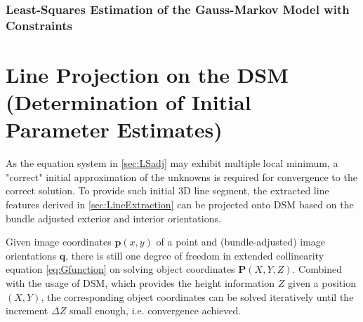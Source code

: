 \subsubsection{Least-Squares Estimation of the Gauss-Markov Model with Constraints}
\label{subsubsec:LSadj}

















\section{Line Projection on the DSM (Determination of Initial Parameter Estimates)}
\label{sec:LineProjectionOnDSM}

As the equation system in \cref{sec:LSadj} may exhibit multiple local minimum, a "correct" initial approximation of the unknowns is required for convergence to the correct solution. To provide such initial 3D line segment, the extracted line features derived in \cref{sec:LineExtraction} can be projected onto DSM based on the bundle adjusted exterior and interior orientations.

Given image coordinates $\mathbf{p}(x,y)$ of a point and (bundle-adjusted) image orientations $\mathbf{q}$, there is still one degree of freedom in extended collinearity equation \eqref{eq:Gfunction} on solving object coordinates $\mathbf{P}(X,Y,Z)$. Combined with the usage of DSM, which provides the height information $Z$ given a position $(X,Y)$, the corresponding object coordinates can be solved iteratively until the increment $\Delta Z$ small enough, i.e. convergence achieved. %

